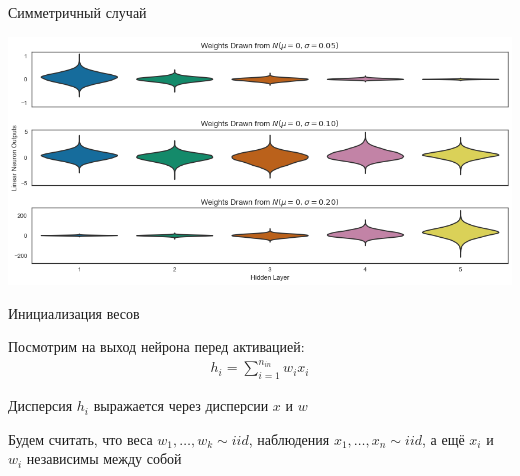 \documentclass[notes,12pt, aspectratio=169]{beamer}
\newenvironment{wideitemize}{\itemize\addtolength{\itemsep}{10pt}}{\enditemize}
\begin{document}
\begin{frame}{Симметричный случай}
\begin{center}
\includegraphics[width=.9\linewidth]{init_sim.png}
\end{center}
\end{frame}


\begin{frame}{Инициализация весов}
\begin{wideitemize}
\item  Посмотрим на выход нейрона перед активацией:
\begin{equation*}
\begin{aligned} 
h_i =  \sum_{i=1}^{n_{in}} w_i x_i 
\end{aligned}
\end{equation*}

\item  Дисперсия $h_i$ выражается через дисперсии $x$ и $w$ 

\item Будем считать, что веса $w_1, \ldots, w_k \sim iid$,  наблюдения $x_1, \ldots, x_n \sim iid$, а ещё $x_i$ и $w_i$ независимы между собой
\end{wideitemize}
\end{frame}
\end{document}
